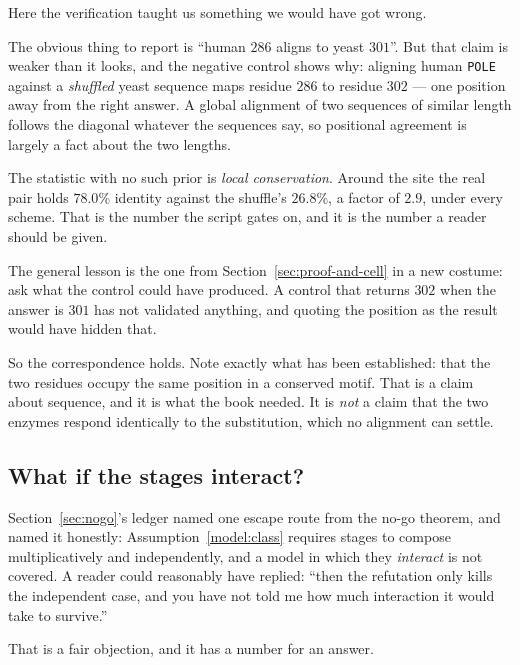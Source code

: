 \begin{remark}\label{rem:diagonal}
Here the verification taught us something we would have got wrong.

The obvious thing to report is ``human $286$ aligns to yeast $301$''. But that
claim is weaker than it looks, and the negative control shows why: aligning
human \texttt{POLE} against a \emph{shuffled} yeast sequence maps residue $286$
to residue $302$ --- one position away from the right answer. A global alignment
of two sequences of similar length follows the diagonal whatever the sequences
say, so positional agreement is largely a fact about the two lengths.

The statistic with no such prior is \emph{local conservation}. Around the site
the real pair holds $78.0\%$ identity against the shuffle's $26.8\%$, a factor of
$2.9$, under every scheme. That is the number the script gates on, and it is the
number a reader should be given.

The general lesson is the one from Section~\ref{sec:proof-and-cell} in a new
costume: ask what the control could have produced. A control that returns $302$
when the answer is $301$ has not validated anything, and quoting the position as
the result would have hidden that.
\end{remark}

So the correspondence holds. Note exactly what has been established: that the
two residues occupy the same position in a conserved motif. That is a claim about
sequence, and it is what the book needed. It is \emph{not} a claim that the two
enzymes respond identically to the substitution, which no alignment can settle.

\subsection{What if the stages interact?}\label{sub:interact}

Section~\ref{sec:nogo}'s ledger named one escape route from the no-go theorem,
and named it honestly: Assumption~\ref{model:class} requires stages to compose
multiplicatively and independently, and a model in which they \emph{interact} is
not covered. A reader could reasonably have replied: ``then the refutation only
kills the independent case, and you have not told me how much interaction it
would take to survive.''

That is a fair objection, and it has a number for an answer.

